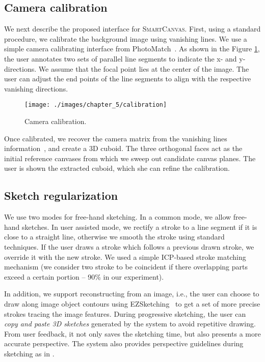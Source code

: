 \subsection{Camera calibration}

We next describe the proposed interface for \textsc{SmartCanvas}. First, using a standard procedure, we calibrate the background image using vanishing lines. We use a simple camera calibrating interface from PhotoMatch~\cite{google-sketchup}.
As shown in the Figure \ref{fig:calibration}, the user annotates two sets of parallel line segments to indicate the x- and y-directions. We assume that the focal point lies at the center of the image. The user can adjust the end points of the line segments to align with the respective vanishing directions.


\begin{figure}[b!]\centering
  \texttt{[image: ./images/chapter\_5/calibration]}
  \caption{Camera calibration.}
  \label{fig:calibration}
\end{figure}

Once calibrated, we recover the camera matrix from the vanishing lines information~\cite{Criminisi:2000:SVM}, and create a 3D cuboid. The three orthogonal faces act as the initial reference canvases from which we sweep out candidate canvas planes. The user is shown the extracted cuboid, which she can refine the calibration.




\subsection{Sketch regularization}

We use two modes for free-hand sketching. In a common mode, we allow free-hand sketches. In user assisted mode, we rectify a stroke to a line segment if it is close to a straight line, otherwise we smooth the stroke using standard techniques. If the user draws a stroke which follows a previous drawn stroke, we override it with the new stroke. We used a simple ICP-based stroke matching mechanism (we consider two stroke to be coincident if there overlapping parts exceed a certain portion -- 90\% in our experiment).

In addition, we support reconstructing from an image, i.e., the user can choose to draw along image object contours using EZSketching~\cite{EZSketching:2014} to get a set of more precise strokes tracing the image features.
During progressive sketching, the user can \emph{copy and paste 3{D} sketches} generated by the system to avoid repetitive drawing. From user feedback, it not only saves the sketching time, but also presents a more accurate perspective. The system also provides perspective guidelines during sketching as in \cite{ilovesketch08}.

